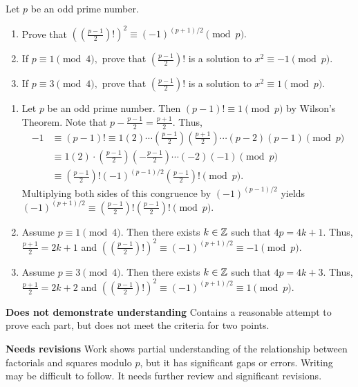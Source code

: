 \documentclass[letterpaper, 11pt]{ximera}
\begin{document}
\begin{ex}
	Let $p$ be an odd prime number. 
	\begin{enumerate}[label=(\alph*)]
		 \item Prove that $\left(\left(\frac{p-1}{2}\right)!\right)^2\equiv (-1)^{(p+1)/2}\pmod{p}.$
		 \item If $p\equiv 1\pmod{4},$ prove that $\left(\frac{p-1}{2}\right)!$ is a solution to $x^2\equiv -1\pmod{p}$.
		  \item If $p\equiv 3\pmod{4},$ prove that $\left(\frac{p-1}{2}\right)!$ is a solution to $x^2\equiv 1\pmod{p}$.
	\end{enumerate}

	\begin{solution}
		\begin{enumerate}[label=(\alph*)]
			\item Let $p$ be an odd prime number. Then $(p-1)!\equiv 1\pmod{p}$ by Wilson's Theorem. Note that $p-\frac{p-1}{2}=\frac{p+1}{2}.$ Thus, 
			\begin{align*}
				-1 &\equiv (p-1)!\equiv 1(2)\cdots \left(\frac{p-1}{2}\right)\left(\frac{p+1}{2}\right)\cdots (p-2)(p-1)\pmod{p}\\
				&\equiv 1(2)\cdot
				\left(\frac{p-1}{2}\right)\left(-\frac{p-1}{2}\right)\cdots (-2)(-1)\pmod{p}\\
				&\equiv\left(\frac{p-1}{2}\right)! (-1)^{(p-1)/2}\left(\frac{p-1}{2}\right)!\pmod{p}.
			\end{align*}
			Multiplying both sides of this congruence by $(-1)^{(p-1)/2}$ yields $(-1)^{(p+1)/2}\equiv\left(\frac{p-1}{2}\right)!\left(\frac{p-1}{2}\right)!\pmod{p}.$
			\item Assume $p\equiv 1\pmod{4}.$ Then there exists $k\in\mathbb Z$ such that $4p=4k+1.$ Thus, $\frac{p+1}{2}=2k+1$ and $\left(\left(\frac{p-1}{2}\right)!\right)^2\equiv (-1)^{(p+1)/2}\equiv -1\pmod{p}.$
			\item Assume $p\equiv 3\pmod{4}.$ Then there exists $k\in\mathbb Z$ such that $4p=4k+3.$ Thus, $\frac{p+1}{2}=2k+2$ and $\left(\left(\frac{p-1}{2}\right)!\right)^2\equiv (-1)^{(p+1)/2}\equiv 1\pmod{p}.$
	   \end{enumerate}
   \end{solution}

\begin{writeRubric}
    \item \textbf{Does not demonstrate understanding}
     Contains a reasonable attempt to prove each part, but does not meet the criteria for two points.
    \item \textbf{Needs revisions} Work shows partial understanding of the relationship between factorials and squares modulo $p$, but it has significant gaps or errors. Writing may be difficult to follow. It needs further review and significant revisions.
     

\end{writeRubric}
\end{ex}
\end{document}

